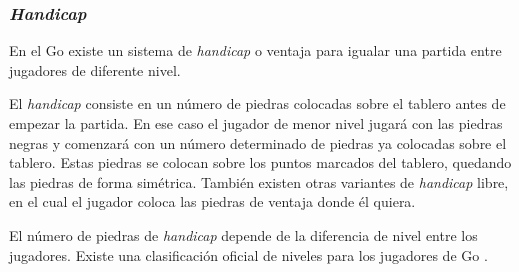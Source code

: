 \subsubsection{\textit{Handicap}}
\label{ssec:handicap_go}
En el Go existe un sistema de \textit{handicap} o ventaja para igualar una partida entre jugadores de diferente nivel.

El \textit{handicap} consiste en un número de piedras colocadas sobre el tablero antes de empezar la partida.
En ese caso el jugador de menor nivel jugará con las piedras negras y comenzará con un número determinado de piedras ya colocadas sobre el tablero.
Estas piedras se colocan sobre los puntos marcados del tablero, quedando las piedras de forma simétrica.
También existen otras variantes de \textit{handicap} libre, en el cual el jugador coloca las piedras de ventaja donde él quiera.

El número de piedras de \textit{handicap} depende de la diferencia de nivel entre los jugadores. 
Existe una clasificación oficial de niveles para los jugadores de Go .

